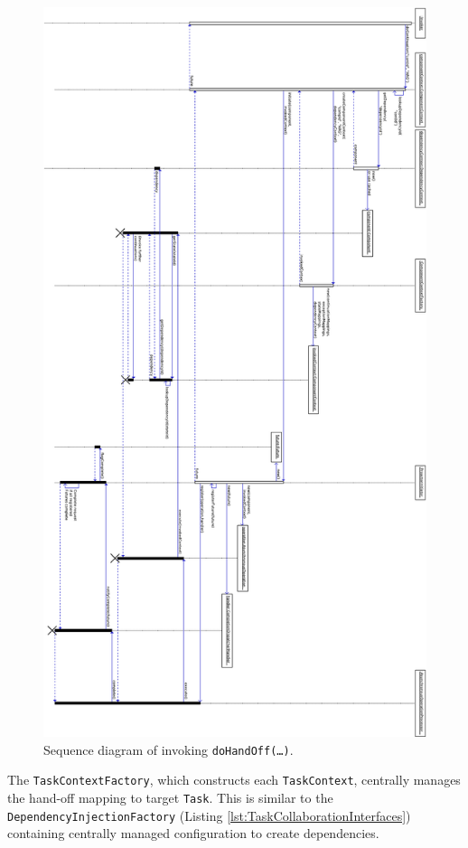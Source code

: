 \documentclass[prodmode]{style/acmlarge}
\begin{document}
\begin{figure}[!t]
\centering
\includegraphics[width=6in]{DoContinuationSequenceDiagram}
\caption{Sequence diagram of invoking \texttt{doHandOff(\ldots)}.}
\label{fig:DoContinuationSequenceDiagram}
\end{figure}

The \texttt{TaskContextFactory}, which constructs each \texttt{TaskContext},
centrally manages the hand-off mapping to target \texttt{Task}. This is similar
to the \texttt{DependencyInjectionFactory} (Listing
\ref{lst:TaskCollaborationInterfaces}) containing centrally managed
configuration to create dependencies.
\end{document}
